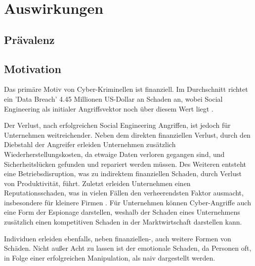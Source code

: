 \chapter{Auswirkungen}
\label{chapter:auswirkungen}


\section{Prävalenz}

\section{Motivation}

Das primäre Motiv von Cyber-Kriminellen ist finanziell. Im Durchschnitt richtet ein 'Data Breach'
4.45 Millionen US-Dollar an Schaden an, wobei Social Engineering als initialer Angriffsvektor noch
über diesem Wert liegt .


Der Verlust, nach erfolgreichen Social Engineering Angriffen, ist jedoch für Unternehmen weitreichender.
Neben dem direkten finanziellen Verlust, durch den Diebstahl der Angreifer erleiden Unternehmen zusätzlich
Wiederherstellungskosten, da etwaige Daten verloren gegangen sind, und Sicherheitslücken gefunden und repariert
werden müssen. Des Weiteren entsteht eine Betriebsdisruption, was zu indirektem finanziellen Schaden, durch
Verlust von Produktivität, führt. Zuletzt erleiden Unternehmen einen Reputationsschaden, was in vielen Fällen
den verheerendsten Faktor ausmacht, insbesondere für kleinere Firmen .
Für Unternehmen können Cyber-Angriffe auch eine Form der Espionage darstellen, weshalb der Schaden eines
Unternehmens zusätzlich einen kompetitiven Schaden in der Marktwirtschaft darstellen kann.

Individuen erleiden ebenfalls, neben finanziellen-, auch weitere Formen von Schäden.
Nicht außer Acht zu lassen ist der emotionale Schaden, da Personen oft, in Folge einer erfolgreichen
Manipulation, als naiv dargestellt werden.







